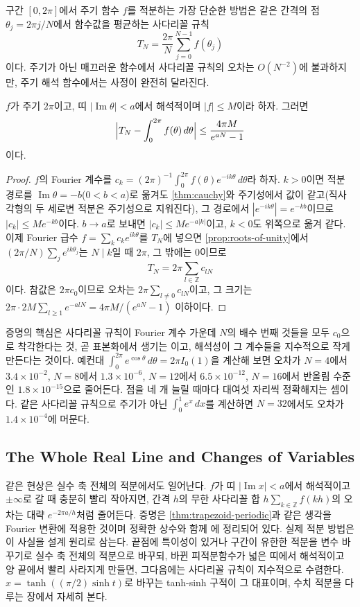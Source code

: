 구간 $[0,2\pi]$에서 주기 함수 $f$를 적분하는 가장 단순한 방법은 같은 간격의 점 $\theta_j=2\pi j/N$에서 함수값을 평균하는 사다리꼴 규칙
\[
T_N=\frac{2\pi}{N}\sum_{j=0}^{N-1}f(\theta_j)
\]
이다. 주기가 아닌 매끄러운 함수에서 사다리꼴 규칙의 오차는 $O(N^{-2})$에 불과하지만, 주기 해석 함수에서는 사정이 완전히 달라진다.

\begin{theorem}
\label{thm:trapezoid-periodic}
$f$가 주기 $2\pi$이고, 띠 $|\operatorname{Im}\theta|<a$에서 해석적이며 $|f|\le M$이라 하자. 그러면
\[
\Bigl|T_N-\int_0^{2\pi}f(\theta)\,d\theta\Bigr|\le\frac{4\pi M}{e^{aN}-1}
\]
이다.
\end{theorem}

\begin{proof}
$f$의 Fourier 계수를 $c_k=(2\pi)^{-1}\int_0^{2\pi}f(\theta)e^{-ik\theta}\,d\theta$라 하자. $k>0$이면 적분 경로를 $\operatorname{Im}\theta=-b$($0<b<a$)로 옮겨도 \cref{thm:cauchy}와 주기성에서 값이 같고(직사각형의 두 세로변 적분은 주기성으로 지워진다), 그 경로에서 $|e^{-ik\theta}|=e^{-kb}$이므로 $|c_k|\le Me^{-kb}$이다. $b\to a$로 보내면 $|c_k|\le Me^{-a|k|}$이고, $k<0$도 위쪽으로 옮겨 같다. 이제 Fourier 급수 $f=\sum_kc_ke^{ik\theta}$를 $T_N$에 넣으면 \cref{prop:roots-of-unity}에서 $(2\pi/N)\sum_je^{ik\theta_j}$는 $N\mid k$일 때 $2\pi$, 그 밖에는 $0$이므로
\[
T_N=2\pi\sum_{l\in\mathbb{Z}}c_{lN}
\]
이다. 참값은 $2\pi c_0$이므로 오차는 $2\pi\sum_{l\ne0}c_{lN}$이고, 그 크기는 $2\pi\cdot2M\sum_{l\ge1}e^{-alN}=4\pi M/(e^{aN}-1)$ 이하이다.
\end{proof}

증명의 핵심은 사다리꼴 규칙이 Fourier 계수 가운데 $N$의 배수 번째 것들을 모두 $c_0$으로 착각한다는 것, 곧 표본화에서 생기는 이고, 해석성이 그 계수들을 지수적으로 작게 만든다는 것이다. 예컨대 $\int_0^{2\pi}e^{\cos\theta}\,d\theta=2\pi I_0(1)$을 계산해 보면 오차가 $N=4$에서 $3.4\times10^{-2}$, $N=8$에서 $1.3\times10^{-6}$, $N=12$에서 $6.5\times10^{-12}$, $N=16$에서 반올림 수준인 $1.8\times10^{-15}$으로 줄어든다. 점을 네 개 늘릴 때마다 대여섯 자리씩 정확해지는 셈이다. 같은 사다리꼴 규칙으로 주기가 아닌 $\int_0^1e^x\,dx$를 계산하면 $N=32$에서도 오차가 $1.4\times10^{-4}$에 머문다.

\subsection{The Whole Real Line and Changes of Variables}

같은 현상은 실수 축 전체의 적분에서도 일어난다. $f$가 띠 $|\operatorname{Im}x|<a$에서 해석적이고 $\pm\infty$로 갈 때 충분히 빨리 작아지면, 간격 $h$의 무한 사다리꼴 합 $h\sum_{k\in\mathbb{Z}}f(kh)$의 오차는 대략 $e^{-2\pi a/h}$처럼 줄어든다. 증명은 \cref{thm:trapezoid-periodic}과 같은 생각을 Fourier 변환에 적용한 것이며 정확한 상수와 함께 \cite{trefethen2014trapezoidal}에 정리되어 있다. 실제 적분 방법은 이 사실을 설계 원리로 삼는다. 끝점에 특이성이 있거나 구간이 유한한 적분을 변수 바꾸기로 실수 축 전체의 적분으로 바꾸되, 바뀐 피적분함수가 넓은 띠에서 해석적이고 양 끝에서 빨리 사라지게 만들면, 그다음에는 사다리꼴 규칙이 지수적으로 수렴한다. $x=\tanh((\pi/2)\sinh t)$로 바꾸는 tanh-sinh 구적이 그 대표이며, 수치 적분을 다루는 장에서 자세히 본다.

